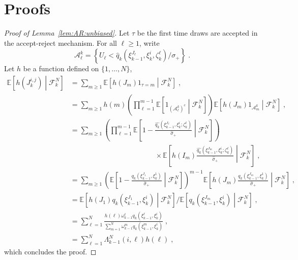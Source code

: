 \documentclass[12pt]{article}
\newcommand{\eqsp}{\;}
\newcommand{\1}{\mathrm{1}}
\begin{document}
\section{Proofs}
\label{sec:append:proofs}
\begin{proof}[Proof of Lemma~\ref{lem:AR:unbiased}]
Let $\tau$ be the first time  draws are accepted in the accept-reject mechanism. For all $\ell\ge 1$, write
\[
\mathcal{A}^k_{\ell} = \left\{U_\ell<\widehat{q}_{k}(\xi_{k-1}^{J_\ell},\xi_k^{i},\zeta^{\ell}_{k})/\sigma_+\right\}\eqsp.
\]
Let $h$ be a function defined on $\{1,\ldots,N\}$,
\begin{align*}
\mathbb{E}\left[h(J^{i,j}_k)\middle| \mathcal{F}_k^N\right] & = \sum_{m\ge 1}\mathbb{E}\left[h(J_m)\1_{\tau=m}\middle| \mathcal{F}_k^N\right]\eqsp,\\
& = \sum_{m\ge 1}h(m)\left(\prod_{\ell=1}^{m-1}\mathbb{E}\left[\1_{(\mathcal{A}^k_{\ell})^c}\middle| \mathcal{F}_k^N\right]\right)\mathbb{E}\left[h(J_m)\1_{\mathcal{A}^k_{m}}\middle| \mathcal{F}_k^N\right]\eqsp,\\
& = \sum_{m\ge 1}\left(\prod_{\ell=1}^{m-1}\mathbb{E}\left[1-\frac{\widehat{q_k}(\xi_{k-1}^{J_\ell},\xi_k^{i};\zeta_k^{\ell})}{\hat{\sigma}_{+}}\middle| \mathcal{F}_k^N\right]\right)\\
&\hspace{5cm}\times\mathbb{E}\left[h(I_m)\frac{\widehat{q_k}(\xi_{k-1}^{J_m},\xi_k^{i};\zeta_k^{\ell})}{\hat{\sigma}_{+}}\middle| \mathcal{F}_k^N\right]\eqsp,\\
& = \sum_{m\ge 1}\left(\mathbb{E}\left[1-\frac{q_k(\xi_{k-1}^{J_1},\xi_k^{1})}{\hat{\sigma}_{+}}\middle| \mathcal{F}_k^N\right]\right)^{m-1}\mathbb{E}\left[h(J_m)\frac{q_k(\xi_{k-1}^{J_m},\xi_k^{1})}{\hat{\sigma}_{+}}\middle| \mathcal{F}_k^N\right]\eqsp,\\
& = \mathbb{E}\left[h(J_1)q_k(\xi_{k-1}^{J_1},\xi_k^{i})\middle| \mathcal{F}_k^N\right]/\mathbb{E}\left[q_k(\xi_{k-1}^{J_m},\xi_k^{i})\middle| \mathcal{F}_k^N\right]\eqsp,\\
& = \sum_{\ell=1}^N \frac{h(\ell)\omega_{k-1}^{\ell}q_k(\xi_{k-1}^{\ell},\xi_k^{i})}{\sum_{m=1}^N\omega_{k-1}^{m}q_k(\xi_{k-1}^{m},\xi_k^{i})}\eqsp,\\
&= \sum_{\ell=1}^N \Lambda_{k-1}^N(i,\ell)h(\ell) \eqsp,
\end{align*}
which concludes the proof.


\end{proof}
\end{document}
